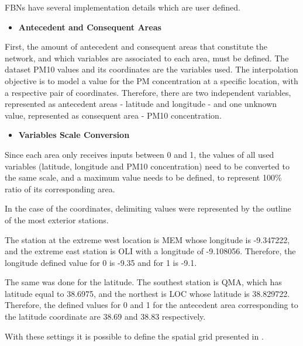 FBNs have several implementation details which are user defined.

\begin{itemize}[leftmargin=0.0mm]
  \item[] \textbf{Antecedent and Consequent Areas}
\end{itemize}

\noindent
First, the amount of antecedent and consequent areas that constitute the network, and which variables are associated to each area, must be defined. The dataset PM10 values and its coordinates are the variables used. The interpolation objective is to model a value for the PM concentration at a specific location, with a respective pair of coordinates. Therefore, there are two independent variables, represented as antecedent areas - latitude and longitude - and one unknown value, represented as consequent area - PM10 concentration.

\begin{itemize}[leftmargin=0.0mm]
  \item[] \textbf{Variables Scale Conversion}
\end{itemize}

\noindent
Since each area only receives inputs between 0 and 1, the values of all used variables (latitude, longitude and PM10 concentration) need to be converted to the same scale, and a maximum value needs to be defined, to represent 100\% ratio of its corresponding area.

In the case of the coordinates, delimiting values were represented by the outline of the most exterior stations. 

The station at the extreme west location is \ac{MEM} whose longitude is -9.347222, and the extreme east station is \ac{OLI} with a longitude of -9.108056. Therefore, the longitude defined value for 0 is -9.35 and for 1 is -9.1.

The same was done for the latitude. The southest station is \ac{QMA}, which has latitude equal to 38.6975, and the northest is \ac{LOC} whose latitude is 38.829722. Therefore, the defined values for 0 and 1 for the antecedent area corresponding to the latitude coordinate are 38.69 and 38.83 respectively.

With these settings it is possible to define the spatial grid presented in .

